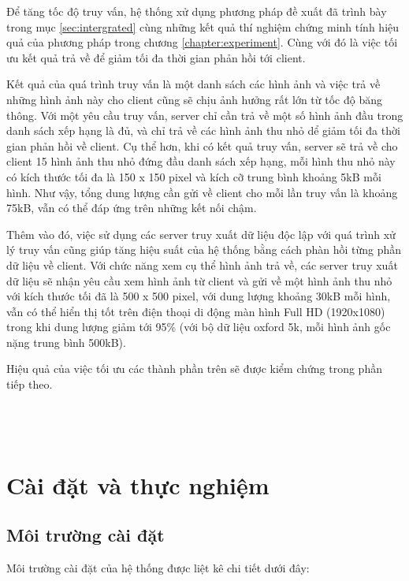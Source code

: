 \begin{itemize}
Để tăng tốc độ truy vấn, hệ thống xử dụng phương pháp đề xuất đã trình bày trong mục \ref{sec:intergrated} cùng những kết quả thí nghiệm chứng minh tính hiệu quả của phương pháp trong chương \ref{chapter:experiment}. Cùng với đó là việc tối ưu kết quả trả về để giảm tối đa thời gian phản hồi tới client.

Kết quả của quá trình truy vấn là một danh sách các hình ảnh và việc trả về những hình ảnh này cho client cũng sẽ chịu ảnh hưởng rất lớn từ tốc độ băng thông. Với một yêu cầu truy vấn, server chỉ cần trả về một số hình ảnh đầu trong danh sách xếp hạng là đủ, và chỉ trả về các hình ảnh thu nhỏ dể giảm tối đa thời gian phản hồi về client. Cụ thể hơn, khi có kết quả truy vấn, server sẽ trả về cho client 15 hình ảnh thu nhỏ đứng đầu danh sách xếp hạng, mỗi hình thu nhỏ này có kích thước tối đa là 150 x 150 pixel và kích cỡ trung bình khoảng 5kB mỗi hình. Như vậy, tổng dung lượng cần gửi về client cho mỗi lần truy vấn là khoảng 75kB, vẫn có thể đáp ứng trên những kết nối chậm. 

Thêm vào đó, việc sử dụng các server truy xuất dữ liệu độc lập với quá trình xử lý truy vấn cũng giúp tăng hiệu suất của hệ thống bằng cách phàn hồi từng phần dữ liệu về client. Với chức năng xem cụ thể hình ảnh trả về, các server truy xuất dữ liệu sẽ nhận yêu cầu xem hình ảnh từ client và gửi về một hình ảnh thu nhỏ với kích thước tối đã là 500 x 500 pixel, với dung lượng khoảng 30kB mỗi hình, vẫn có thể hiển thị tốt trên điện thoại di động màn hình Full HD (1920x1080) trong khi dung lượng giảm tới 95\% (với bộ dữ liệu oxford 5k, mỗi hình ảnh gốc nặng trung bình 500kB).

\end{itemize}

Hiệu quả của việc tối ưu các thành phần trên sẽ được kiểm chứng trong phần tiếp theo.
\\
\\
\\
\\
\section{Cài đặt và thực nghiệm}
\label{c5-caidat}
	\subsection{Môi trường cài đặt}
	Môi trường cài đặt của hệ thống được liệt kê chi tiết dưới đây:
	
